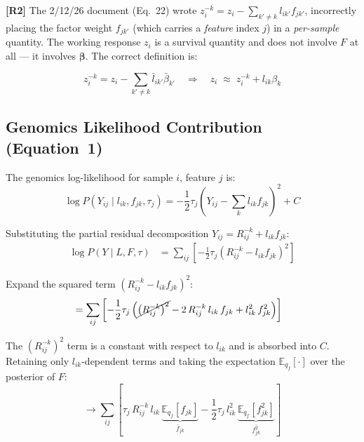 \documentclass[11pt]{article}
\newcommand{\lbar}[2]{\bar{l}_{#1#2}}
\newcommand{\fbar}[2]{\bar{f}_{#1#2}}
\newcommand{\betabar}[1]{\bar{\beta}_{#1}}
\newcommand{\fsec}[2]{\overline{f^2_{#1#2}}}
\begin{document}
\begin{correctionbox}
\textbf{[R2]} The 2/12/26 document (Eq.\ 22) wrote
$z^{-k}_i = z_i - \sum_{k'\neq k} l_{ik'}f_{jk'}$,
incorrectly placing the factor weight $f_{jk'}$ (which carries a
\emph{feature} index $j$) in a \emph{per-sample} quantity.  The working
response $z_i$ is a survival quantity and does not involve $F$ at all --- it
involves $\bm{\beta}$.  The correct definition is:
\end{correctionbox}

\begin{equation}\label{eq:z-residual}
  z^{-k}_i = z_i - \sum_{k'\neq k}\lbar{i}{k'}\betabar{k'}
  \quad\Rightarrow\quad
  z_i \;\approx\; z^{-k}_i + l_{ik}\beta_k
\end{equation}

\subsection{Genomics Likelihood Contribution (Equation~1)}

The genomics log-likelihood for sample $i$, feature $j$ is:
\begin{equation}
  \log P(Y_{ij} \mid l_{ik}, f_{jk}, \tau_j)
  = -\frac{1}{2}\tau_j\left(Y_{ij} - \sum_k l_{ik}f_{jk}\right)^2 + C
\end{equation}

\begin{derivbox}
Substituting the partial residual decomposition $Y_{ij} = R^{-k}_{ij} + l_{ik}f_{jk}$:
\begin{align}
  \log P(Y \mid L, F, \tau)
  &= \sum_{ij}\left[-\frac{1}{2}\tau_j\left(R^{-k}_{ij} - l_{ik}f_{jk}\right)^2\right]
  \label{eq:gen-lik-1}
\end{align}

Expand the squared term $(R^{-k}_{ij} - l_{ik}f_{jk})^2$:
\begin{align}
  &= \sum_{ij}\left[-\frac{1}{2}\tau_j
     \left(\cancel{\left(R^{-k}_{ij}\right)^2}
           - 2\,R^{-k}_{ij}\,l_{ik}\,f_{jk}
           + l_{ik}^2\,f_{jk}^2
     \right)\right]
  \label{eq:gen-lik-expand}
\end{align}

The $(R^{-k}_{ij})^2$ term is a constant with respect to $l_{ik}$ and is
absorbed into $C$.  Retaining only $l_{ik}$-dependent terms and taking the
expectation $\mathbb{E}_{q_f}[\cdot]$ over the posterior of $F$:
\begin{equation}
  \longrightarrow \sum_{ij}\left[
    \tau_j\,R^{-k}_{ij}\,l_{ik}\,\underbrace{\mathbb{E}_{q_f}[f_{jk}]}_{\fbar{j}{k}}
    - \frac{1}{2}\tau_j\,l_{ik}^2\,\underbrace{\mathbb{E}_{q_f}[f_{jk}^2]}_{\fsec{j}{k}}
  \right]
  \label{eq:gen-lik-terms}
\end{equation}
\end{derivbox}
\end{document}

